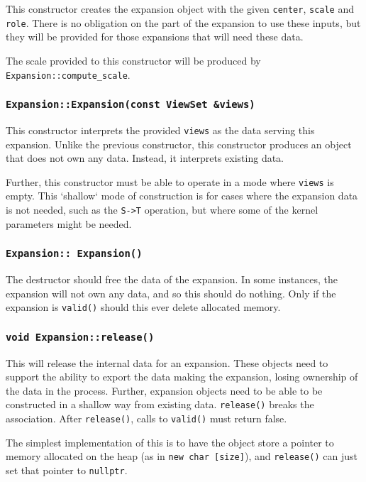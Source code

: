 This constructor creates the expansion object with the given \texttt{center},
\texttt{scale} and \texttt{role}. There is no obligation on the part of the
expansion to use these inputs, but they will be provided for those expansions
that will need these data.

The scale provided to this constructor will be produced by
\texttt{Expansion::compute\_scale}.

\subsubsection{\texttt{Expansion::Expansion(const ViewSet \&views)}}

This constructor interprets the provided \texttt{views} as the data serving
this expansion. Unlike the previous constructor, this constructor produces an
object that does not own any data. Instead, it interprets existing data.

Further, this constructor must be able to operate in a mode where \texttt{views}
is empty. This `shallow` mode of construction is for cases where the
expansion data is not needed, such as the \texttt{S->T} operation, but where
some of the kernel parameters might be needed.

\subsubsection{\texttt{Expansion::~Expansion()}}

The destructor should free the data of the expansion. In some instances, the
expansion will not own any data, and so this should do nothing. Only if the
expansion is \texttt{valid()} should this ever delete allocated memory.

\subsubsection{\texttt{void Expansion::release()}}

This will release the internal data for an expansion. These objects need to
support the ability to export the data making the expansion, losing ownership
of the data in the process. Further, expansion objects need to be able to be
constructed in a shallow way from existing data. \texttt{release()} breaks the
association. After \texttt{release()}, calls to \texttt{valid()} must return
false.

The simplest implementation of this is to have the object store a pointer to
memory allocated on the heap (as in \texttt{new char [size]}), and
\texttt{release()} can just set that pointer to \texttt{nullptr}.

